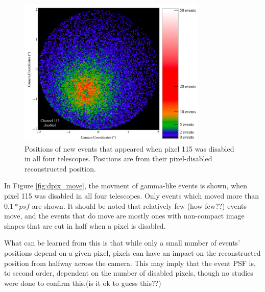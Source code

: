    \begin{figure}[ht]
      \centering
      \includegraphics[width=0.8\textwidth]{images/disabled_pixel/appearing_events}
      \caption[Newly Appearing Events]{
        Positions of new events that appeared when pixel 115 was disabled in all four telescopes.
        Positions are from their pixel-disabled reconstructed position.
      }
      \label{fig:dpix_appear}
    \end{figure}

    In Figure \ref{fig:dpix_move}, the movment of gamma-like events is shown, when pixel 115 was disabled in all four telescopes.
    Only events which moved more than $0.1*psf$ are shown.
    It should be noted that relatively few (how few??) events move, and the events that do move are mostly ones with non-compact image shapes that are cut in half when a pixel is disabled.

    What can be learned from this is that while only a small number of events' positions depend on a given pixel, pixels can have an impact on the reconstructed position from halfway across the camera.
    This may imply that the event PSF is, to second order, dependent on the number of disabled pixels, though no studies were done to confirm this.(is it ok to guess this??)


